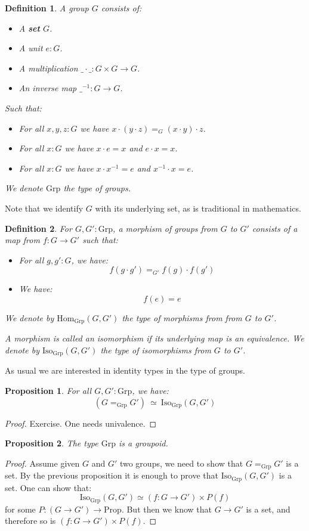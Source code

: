 \documentclass{article}
\renewcommand{\r}{\rightarrow}
\newcommand{\Grp}{\mathrm{Grp}}
\newcommand{\Hom}{\mathrm{Hom}}
\newcommand{\Iso}{\mathrm{Iso}}
\newcommand{\Prop}{\mathrm{Prop}}
\newtheorem{definition}{Definition}
\newtheorem{proposition}{Proposition}
\begin{document}
\begin{definition}
A group $G$ consists of:
\begin{itemize}
\item A {\bf  set} $G$.
\item A unit $e:G$.
\item A multiplication $\_\cdot\_ : G\times G\r G$.
\item An inverse map $\_^{-1} : G\r G$. 
\end{itemize}
Such that:
\begin{itemize}
\item For all $x,y,z:G$ we have $x\cdot(y\cdot z) =_G (x\cdot y)\cdot z$.
\item For all $x:G$ we have $x\cdot e = x$ and $e\cdot x =x$.
\item For all $x:G$ we have $x\cdot x^{-1} = e$ and $x^{-1}\cdot x = e$.
\end{itemize}
We denote $\Grp$ the type of groups. 
\end{definition}

Note that we identify $G$ with its underlying set, as is traditional in mathematics.

\begin{definition}
For $G,G':\Grp$, a morphism of groups from $G$ to $G'$ consists of a map from $f:G\r G'$ such that:
\begin{itemize}
\item For all $g,g':G$, we have: 
\[f(g\cdot g') =_{G'} f(g)\cdot f(g')\]
\item We have:
\[f(e) = e\]
\end{itemize}
We denote by $\Hom_{\Grp}(G,G')$ the type of morphisms from from $G$ to $G'$. 

A morphism is called an isomorphism if its underlying map is an equivalence. We denote by $\Iso_{\Grp}(G,G')$ the type of isomorphisms from $G$ to $G'$.
\end{definition}

As usual we are interested in identity types in the type of groups.

\begin{proposition}
For all $G,G':\Grp$, we have:
\[(G=_{\Grp} G') \ \simeq \ \Iso_{\Grp}(G,G')\]
\end{proposition}
\begin{proof}
Exercise. One needs univalence.
\end{proof}

\begin{proposition}
The type $\Grp$ is a groupoid.
\end{proposition}
\begin{proof}
Assume given $G$ and $G'$ two groups, we need to show that $G=_\Grp G'$ is a set. By the previous proposition it is enough to prove that $ \Iso_{\Grp}(G,G')$ is a set. One can show that: 
\[\Iso_{\Grp}(G,G') \simeq (f:G\r G')\times P(f)\]
for some $P : (G\r G') \r \Prop$. But then we know that $G\r G'$ is a set, and therefore so is $(f:G\r G')\times P(f)$.
\end{proof}
\end{document}
